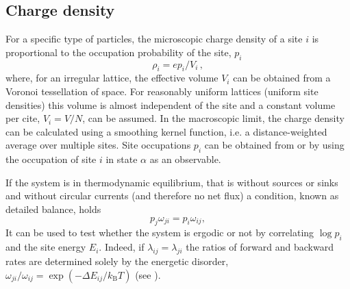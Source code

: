 \subsection{Charge density}
For a specific type of particles, the microscopic charge density of a site $i$ is proportional to the occupation probability of the site, $p_i$
\begin{equation}
 \rho_i = e p_i / V_i\, ,
\end{equation}
where,  for an irregular lattice, the effective volume $V_i$ can be obtained from a Voronoi tessellation of space. For reasonably uniform lattices (uniform site densities) this volume is almost independent of the site and a constant volume per cite, $V_i = V/N$, can be assumed.  In the macroscopic limit, the charge density can be calculated using a smoothing kernel function, i.e. a distance-weighted average over multiple sites. Site occupations $p_i$ can be obtained from  or   by using the occupation of site $i$ in state $\alpha$ as an observable.

If the system is in thermodynamic equilibrium, that is without sources or sinks and without circular currents (and therefore no net flux) a condition, known as detailed balance, holds
%
\begin{equation}
\label{equ:detailed_balance}
  p_j \omega_{ji} = p_i \omega_{ij},
\end{equation}
%
It can be used to test whether the system is ergodic or not by correlating $\log p_i$ and the site energy $E_i$. Indeed, if $\lambda_{ij} = \lambda_{ji}$ the ratios of forward and backward rates are determined solely by the energetic disorder, $\omega_{ji} / \omega_{ij} = \exp(-\Delta E_{ij} / k_\text{B} T)$ (see ).

